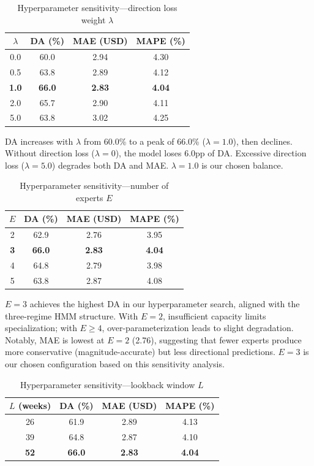 \documentclass[3p,times]{elsarticle}
\begin{document}
\begin{table}[htbp]
\centering
\caption{Hyperparameter sensitivity---direction loss weight $\lambda$}
\label{tab:sens_lambda}
\begin{tabular}{cccc}
\toprule
$\lambda$ & DA (\%) & MAE (USD) & MAPE (\%) \\
\midrule
0.0 & 60.0 & 2.94 & 4.30 \\
0.5 & 63.8 & 2.89 & 4.12 \\
\textbf{1.0} & \textbf{66.0} & \textbf{2.83} & \textbf{4.04} \\
2.0 & 65.7 & 2.90 & 4.11 \\
5.0 & 63.8 & 3.02 & 4.25 \\
\bottomrule
\end{tabular}
\end{table}

DA increases with $\lambda$ from 60.0\% to a peak of 66.0\% ($\lambda=1.0$), then declines. Without direction loss ($\lambda=0$), the model loses 6.0pp of DA. Excessive direction loss ($\lambda=5.0$) degrades both DA and MAE. $\lambda=1.0$ is our chosen balance.

\begin{table}[htbp]
\centering
\caption{Hyperparameter sensitivity---number of experts $E$}
\label{tab:sens_experts}
\begin{tabular}{cccc}
\toprule
$E$ & DA (\%) & MAE (USD) & MAPE (\%) \\
\midrule
2 & 62.9 & 2.76 & 3.95 \\
\textbf{3} & \textbf{66.0} & \textbf{2.83} & \textbf{4.04} \\
4 & 64.8 & 2.79 & 3.98 \\
5 & 63.8 & 2.87 & 4.08 \\
\bottomrule
\end{tabular}
\end{table}

$E=3$ achieves the highest DA in our hyperparameter search, aligned with the three-regime HMM structure. With $E=2$, insufficient capacity limits specialization; with $E \geq 4$, over-parameterization leads to slight degradation. Notably, MAE is lowest at $E=2$ (2.76), suggesting that fewer experts produce more conservative (magnitude-accurate) but less directional predictions. $E=3$ is our chosen configuration based on this sensitivity analysis.

\begin{table}[htbp]
\centering
\caption{Hyperparameter sensitivity---lookback window $L$}
\label{tab:sens_lookback}
\begin{tabular}{cccc}
\toprule
$L$ (weeks) & DA (\%) & MAE (USD) & MAPE (\%) \\
\midrule
26 & 61.9 & 2.89 & 4.13 \\
39 & 64.8 & 2.87 & 4.10 \\
\textbf{52} & \textbf{66.0} & \textbf{2.83} & \textbf{4.04} \\
\bottomrule
\end{tabular}
\end{table}
\end{document}
